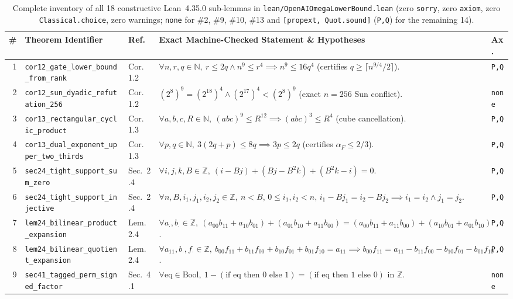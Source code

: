 \documentclass[10pt,twocolumn]{article}
\newcommand{\ZZ}{\mathbb{Z}}
\newcommand{\NN}{\mathbb{N}}
\begin{document}
\begin{table}[t]
\centering
\caption{Complete inventory of all 18 constructive Lean~4.35.0 sub-lemmas in \texttt{lean/OpenAIOmegaLowerBound.lean} (zero \texttt{sorry}, zero \texttt{axiom}, zero \texttt{Classical.choice}, zero warnings; \texttt{none} for \#2, \#9, \#10, \#13 and \texttt{[propext, Quot.sound]} (\texttt{P,Q}) for the remaining 14).}
\label{tab:lean18}
\scriptsize
\setlength{\tabcolsep}{2.2pt}
\begin{tabular}{@{}r l l p{9.7cm} l@{}}
\toprule
\# & Theorem Identifier & Ref.~\cite{openai2026omega94} & Exact Machine-Checked Statement \& Hypotheses & Ax. \\
\midrule
1 & \texttt{cor12\_gate\_lower\_bound\_from\_rank} & Cor.~1.2 & $\forall n,r,q\in\NN,\ r\le 2q \wedge n^9\le r^4 \implies n^9\le 16 q^4$ (certifies $q\ge\lceil n^{9/4}/2\rceil$). & \texttt{P,Q} \\
2 & \texttt{cor12\_sun\_dyadic\_refutation\_256} & Cor.~1.2 & $(2^8)^9 = (2^{18})^4 \wedge (2^{17})^4 < (2^8)^9$ (exact $n=256$ Sun conflict). & \texttt{none} \\
3 & \texttt{cor13\_rectangular\_cyclic\_product} & Cor.~1.3 & $\forall a,b,c,R\in\NN,\ (abc)^9 \le R^{12} \implies (abc)^3 \le R^4$ (cube cancellation). & \texttt{P,Q} \\
4 & \texttt{cor13\_dual\_exponent\_upper\_two\_thirds} & Cor.~1.3 & $\forall p,q\in\NN,\ 3(2q + p) \le 8q \implies 3p \le 2q$ (certifies $\alpha_F \le 2/3$). & \texttt{P,Q} \\
5 & \texttt{sec24\_tight\_support\_sum\_zero} & Sec.~2.4 & $\forall i,j,k,B\in\ZZ,\ (i-Bj)+(Bj-B^2 k)+(B^2 k-i)=0$. & \texttt{P,Q} \\
6 & \texttt{sec24\_tight\_support\_injective} & Sec.~2.4 & $\forall n,B,i_1,j_1,i_2,j_2\in\ZZ,\ n<B,\,0\le i_1,i_2<n,\,i_1-Bj_1=i_2-Bj_2 \implies i_1=i_2\wedge j_1=j_2$. & \texttt{P,Q} \\
7 & \texttt{lem24\_bilinear\_product\_expansion} & Lem.~2.4 & $\forall a_{\cdot},b_{\cdot}\in\ZZ,\ (a_{00}b_{11}+a_{10}b_{01})+(a_{01}b_{10}+a_{11}b_{00})=(a_{00}b_{11}+a_{11}b_{00})+(a_{10}b_{01}+a_{01}b_{10})$. & \texttt{P,Q} \\
8 & \texttt{lem24\_bilinear\_quotient\_expansion} & Lem.~2.4 & $\forall a_{11},b_{\cdot},f_{\cdot}\in\ZZ,\ b_{00}f_{11}+b_{11}f_{00}+b_{10}f_{01}+b_{01}f_{10}=a_{11} \implies b_{00}f_{11}=a_{11}-b_{11}f_{00}-b_{10}f_{01}-b_{01}f_{10}$. & \texttt{P,Q} \\
9 & \texttt{sec41\_tagged\_perm\_signed\_factor} & Sec.~4.1 & $\forall\mathrm{eq}\in\mathrm{Bool},\ 1 - (\text{if }\mathrm{eq}\text{ then }0\text{ else }1) = (\text{if }\mathrm{eq}\text{ then }1\text{ else }0)$ in $\ZZ$. & \texttt{none} \\

\end{tabular}
\end{table}
\end{document}

